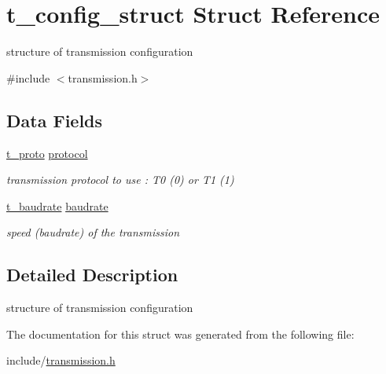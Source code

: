 \hypertarget{structt__config__struct}{\section{t\-\_\-config\-\_\-struct Struct Reference}
\label{structt__config__struct}
}


structure of transmission configuration  




{\ttfamily \#include $<$transmission.\-h$>$}

\subsection*{Data Fields}
\begin{DoxyCompactItemize}
\item 
\hypertarget{structt__config__struct_a4664223c90c66c30c150e6067d93e3ba}{\hyperlink{transmission_8h_a284b4a9e63d48cd157962b2447516b82}{t\-\_\-proto} \hyperlink{structt__config__struct_a4664223c90c66c30c150e6067d93e3ba}{protocol}}\label{structt__config__struct_a4664223c90c66c30c150e6067d93e3ba}

\begin{DoxyCompactList}\small\item\em transmission protocol to use \-: T0 (0) or T1 (1) \end{DoxyCompactList}\item 
\hypertarget{structt__config__struct_a6f883ef7a01ffcee9cf92e0a29509204}{\hyperlink{transmission_8h_a5266b5ad080839acc7a5223b0ca0e1b5}{t\-\_\-baudrate} \hyperlink{structt__config__struct_a6f883ef7a01ffcee9cf92e0a29509204}{baudrate}}\label{structt__config__struct_a6f883ef7a01ffcee9cf92e0a29509204}

\begin{DoxyCompactList}\small\item\em speed (baudrate) of the transmission \end{DoxyCompactList}\end{DoxyCompactItemize}


\subsection{Detailed Description}
structure of transmission configuration 

The documentation for this struct was generated from the following file\-:\begin{DoxyCompactItemize}
\item 
include/\hyperlink{transmission_8h}{transmission.\-h}\end{DoxyCompactItemize}
